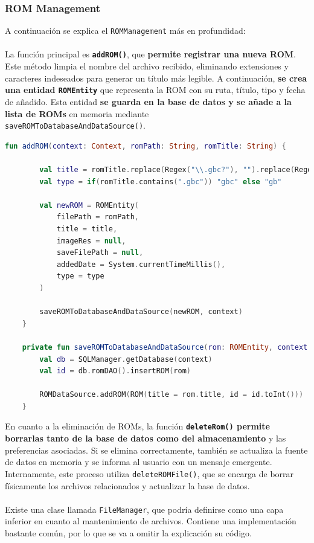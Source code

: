 \subsubsection{ROM Management}
A continuación se explica el \texttt{ROMManagement} más en profundidad:
\\\\
La función principal es \textbf{\texttt{addROM()}}, que \textbf{permite registrar una nueva ROM}. Este método limpia el nombre del archivo recibido, eliminando extensiones y caracteres indeseados para generar un título más legible. A continuación, \textbf{se crea una entidad \texttt{ROMEntity}} que representa la ROM con su ruta, título, tipo y fecha de añadido. Esta entidad \textbf{se guarda en la base de datos y se añade a la lista de ROMs} en memoria mediante 
\\\texttt{saveROMToDatabaseAndDataSource()}.
\clearpage
\begin{lstlisting}[language=Kotlin, caption={ROM Management - Añadir una ROM.}, label={code:romManagementAddRom}]
    fun addROM(context: Context, romPath: String, romTitle: String) {

        val title = romTitle.replace(Regex("\\.gbc?"), "").replace(Regex("_"), " ")
        val type = if(romTitle.contains(".gbc")) "gbc" else "gb"

        val newROM = ROMEntity(
            filePath = romPath,
            title = title,
            imageRes = null,
            saveFilePath = null,
            addedDate = System.currentTimeMillis(),
            type = type
        )

        saveROMToDatabaseAndDataSource(newROM, context)
    }

    private fun saveROMToDatabaseAndDataSource(rom: ROMEntity, context: Context) {
        val db = SQLManager.getDatabase(context)
        val id = db.romDAO().insertROM(rom)

        ROMDataSource.addROM(ROM(title = rom.title, id = id.toInt()))
    }
\end{lstlisting}

En cuanto a la eliminación de ROMs, la función \textbf{\texttt{deleteRom()} permite borrarlas tanto de la base de datos como del almacenamiento} y las preferencias asociadas. Si se elimina correctamente, también se actualiza la fuente de datos en memoria y se informa al usuario con un mensaje emergente. Internamente, este proceso utiliza \texttt{deleteROMFile()}, que se encarga de borrar físicamente los archivos relacionados y actualizar la base de datos.
\\\\
Existe una clase llamada \texttt{FileManager}, que podría definirse como una capa inferior en cuanto al mantenimiento de archivos. Contiene una implementación bastante común, por lo que se va a omitir la explicación su código.

